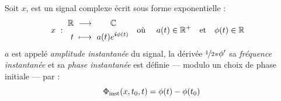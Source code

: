 \begin{definition} \label{def:param_instant}
	Soit $x$, est un signal complexe écrit sous forme exponentielle :
	\begin{align}
		x\ &:\ \begin{aligned}\mathbb{R}\ &\longrightarrow\qquad \mathbb{C} \\
			t\ &\longmapsto\ a(t)e^{\boldsymbol{i} \phi(t)}
		\end{aligned}  &  \text{où }\quad a(t)\in\mathbb{R}^+\quad &\text{et}\quad \phi(t)\in\mathbb{R}
	\end{align}
	$a$ est appelé \emph{amplitude instantanée} du signal, la dérivée $\nicefrac{1}{2\pi}\phi'$ sa \emph{fréquence instantanée} et sa \emph{phase instantanée} est définie --- modulo un choix de phase initiale --- par :
	\begin{equation} \label{eq:phasei}
		\Phi_{\text{\normalfont inst}}(x,t_0,t) = \phi(t) - \phi(t_0)
	\end{equation}
\end{definition}
\skipl 

